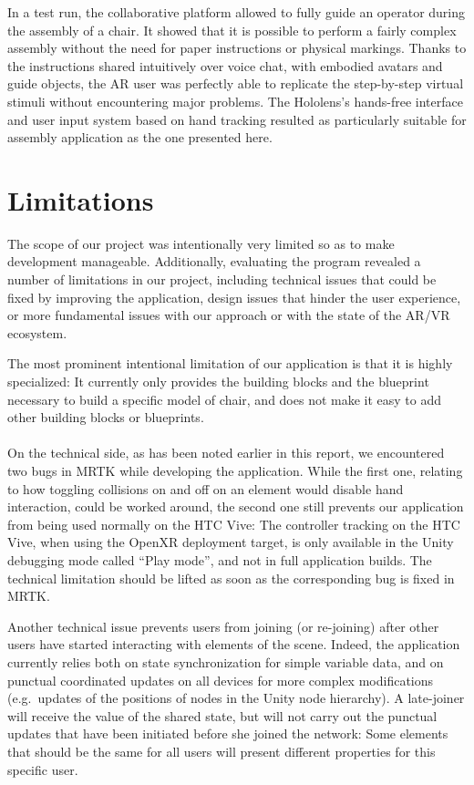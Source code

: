 \documentclass[10pt,twocolumn,letterpaper,english]{article}
\begin{document}
In a test run, the collaborative platform allowed to fully guide an operator during the assembly of a chair. It showed that it is possible to perform a fairly complex assembly without the need for paper instructions or physical markings. Thanks to the instructions shared intuitively over voice chat, with embodied avatars and guide objects, the AR user was perfectly able to replicate the step-by-step virtual stimuli without encountering major problems. The Hololens's hands-free interface and user input system based on hand tracking resulted as particularly suitable for assembly application as the one presented here.


\section{Limitations}

The scope of our project was intentionally very limited so as to make development manageable. Additionally, evaluating the program revealed a number of limitations in our project, including technical issues that could be fixed by improving the application, design issues that hinder the user experience, or more fundamental issues with our approach or with the state of the AR/VR ecosystem.

The most prominent intentional limitation of our application is that it is highly specialized: It currently only provides the building blocks and the blueprint necessary to build a specific model of chair, and does not make it easy to add other building blocks or blueprints.

\paragraph{}
On the technical side, as has been noted earlier in this report, we encountered two bugs in MRTK while developing the application. While the first one, relating to how toggling collisions on and off on an element would disable hand interaction, could be worked around, the second one still prevents our application from being used normally on the HTC Vive: The controller tracking on the HTC Vive, when using the OpenXR deployment target, is only available in the Unity debugging mode called ``Play mode'', and not in full application builds. The technical limitation should be lifted as soon as the corresponding bug is fixed in MRTK.

Another technical issue prevents users from joining (or re-joining) after other users have started interacting with elements of the scene. Indeed, the application currently relies both on state synchronization for simple variable data, and on punctual coordinated updates on all devices for more complex modifications (e.g.\ updates of the positions of nodes in the Unity node hierarchy). A late-joiner will receive the value of the shared state, but will not carry out the punctual updates that have been initiated before she joined the network: Some elements that should be the same for all users will present different properties for this specific user.
\end{document}
